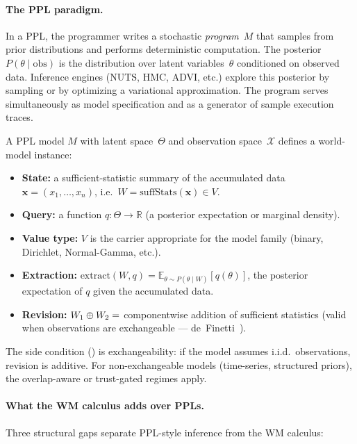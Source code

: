 \paragraph{The PPL paradigm.}
In a PPL, the programmer writes a stochastic \emph{program}~$M$ that
samples from prior distributions and performs deterministic computation.
The posterior $P(\theta \mid \mathrm{obs})$ is the distribution over
latent variables~$\theta$ conditioned on observed data.  Inference
engines (NUTS, HMC, ADVI, etc.) explore this posterior by sampling or
by optimizing a variational approximation.  The program serves
simultaneously as model specification and as a generator of sample
execution traces.

\begin{definition}
\label{def:ppl-wm}
A PPL model $M$ with latent space~$\Theta$ and observation
space~$\mathcal{X}$ defines a world-model instance:
\begin{itemize}
\item \textbf{State:} a sufficient-statistic summary of the
  accumulated data $\mathbf{x} = (x_1, \ldots, x_n)$, i.e.\
  $W = \mathrm{suffStats}(\mathbf{x}) \in V$.
\item \textbf{Query:} a function $q : \Theta \to \mathbb{R}$ (a
  posterior expectation or marginal density).
\item \textbf{Value type:} $V$ is the carrier appropriate for the
  model family (binary, Dirichlet, Normal-Gamma, etc.).
\item \textbf{Extraction:} $\mathrm{extract}(W, q) =
  \mathbb{E}_{\theta \sim P(\theta \mid W)}[q(\theta)]$, the
  posterior expectation of $q$ given the accumulated data.
\item \textbf{Revision:} $W_1 \oplus W_2 = $ componentwise addition
  of sufficient statistics (valid when observations are
  exchangeable --- de~Finetti~\cite{deFinetti1974}).
\end{itemize}
The side condition (\claimConditional{}) is exchangeability: if the
model assumes i.i.d.\ observations, revision is additive.  For
non-exchangeable models (time-series, structured priors), the overlap-aware
or trust-gated regimes apply.
\end{definition}

\paragraph{What the WM calculus adds over PPLs.}
Three structural gaps separate PPL-style inference from the WM calculus:


